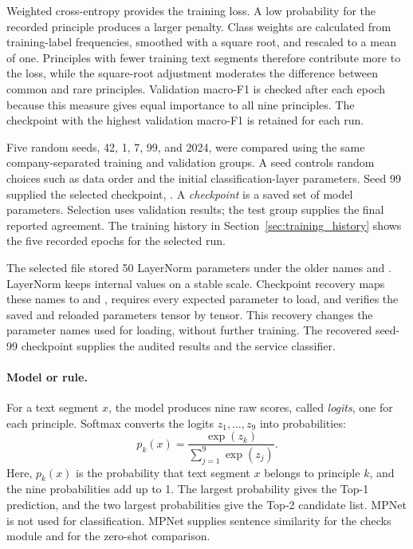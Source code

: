 Weighted cross-entropy provides the training loss. A low probability for the recorded principle produces a larger penalty. Class weights are calculated from training-label frequencies, smoothed with a square root, and rescaled to a mean of one. Principles with fewer training text segments therefore contribute more to the loss, while the square-root adjustment moderates the difference between common and rare principles. Validation macro-F1 is checked after each epoch because this measure gives equal importance to all nine principles. The checkpoint with the highest validation macro-F1 is retained for each run.

Five random seeds, 42, 1, 7, 99, and 2024, were compared using the same company-separated training and validation groups. A seed controls random choices such as data order and the initial classification-layer parameters. Seed 99 supplied the selected checkpoint, . A \emph{checkpoint} is a saved set of model parameters. Selection uses validation results; the test group supplies the final reported agreement. The training history in Section~\ref{sec:training_history} shows the five recorded epochs for the selected run.

The selected file stored 50 LayerNorm parameters under the older names  and . LayerNorm keeps internal values on a stable scale. Checkpoint recovery maps these names to  and , requires every expected parameter to load, and verifies the saved and reloaded parameters tensor by tensor. This recovery changes the parameter names used for loading, without further training. The recovered seed-99 checkpoint supplies the audited results and the service classifier.

\paragraph{Model or rule.} For a text segment $x$, the model produces nine raw scores, called \emph{logits}, one for each principle. Softmax converts the logits $z_1,\dots,z_9$ into probabilities:
\begin{equation}
p_k(x)=\frac{\exp(z_k)}{\sum_{j=1}^{9}\exp(z_j)}.
\label{eq:softmax}
\end{equation}
Here, $p_k(x)$ is the probability that text segment $x$ belongs to principle $k$, and the nine probabilities add up to 1. The largest probability gives the Top-1 prediction, and the two largest probabilities give the Top-2 candidate list. MPNet is not used for classification. MPNet supplies sentence similarity for the checks module and for the zero-shot comparison.

